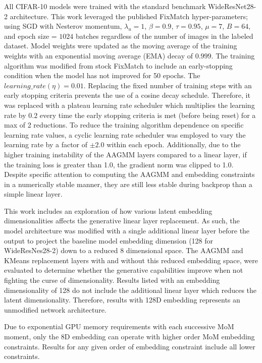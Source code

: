 \documentclass[10pt,twocolumn,letterpaper]{article}
\begin{document}
All CIFAR-10 models were trained with the standard benchmark WideResNet28-2 architecture.
This work leveraged the published FixMatch \cite{sohn2020fixmatch} hyper-parameters; using SGD with Nesterov momentum,  $\lambda_u = 1$, $\beta = 0.9$, $\tau = 0.95$, $\mu = 7$, $B = 64$, and epoch size = $1024$ batches regardless of the number of images in the labeled dataset.
Model weights were updated as the moving average of the training weights with an exponential moving average (EMA) decay of $0.999$.
The training algorithm was modified from stock FixMatch to include an early-stopping condition when the model has not improved for 50 epochs.
The $learning\_rate (\eta) = 0.01$.
Replacing the fixed number of training steps with an early stopping criteria prevents the use of a cosine decay schedule.
Therefore, it was replaced with a plateau learning rate scheduler which multiplies the learning rate by $0.2$ every time the early stopping criteria is met (before being reset) for a max of 2 reductions.
To reduce the training algorithm dependence on specific learning rate values, a cyclic learning rate scheduler was employed to vary the learning rate by a factor of $\pm2.0$ within each epoch.
Additionally, due to the higher training instability of the AAGMM layers compared to a linear layer, if the training loss is greater than 1.0, the gradient norm was clipped to 1.0.
Despite specific attention to computing the AAGMM and embedding constraints in a numerically stable manner, they are still less stable during backprop than a simple linear layer.

This work includes an exploration of how various latent embedding dimensionalities affects the generative linear layer replacement.
As such, the model architecture was modified with a single additional linear layer before the output to project the baseline model embedding dimension (128 for WideResNes28-2) down to a reduced 8 dimensional space.
The AAGMM and KMeans replacement layers with and without this reduced embedding space, were evaluated to determine whether the generative capabilities improve when not fighting the curse of dimensionality.
Results listed with an embedding dimensionality of 128 do not include the additional linear layer which reduces the latent dimensionality. 
Therefore, results with 128D embedding represents an unmodified network architecture.

Due to exponential GPU memory requirements with each successive MoM moment, only the 8D embedding can operate with higher order MoM embedding constraints. Results for any given order of embedding constraint include all lower constraints.
\end{document}
